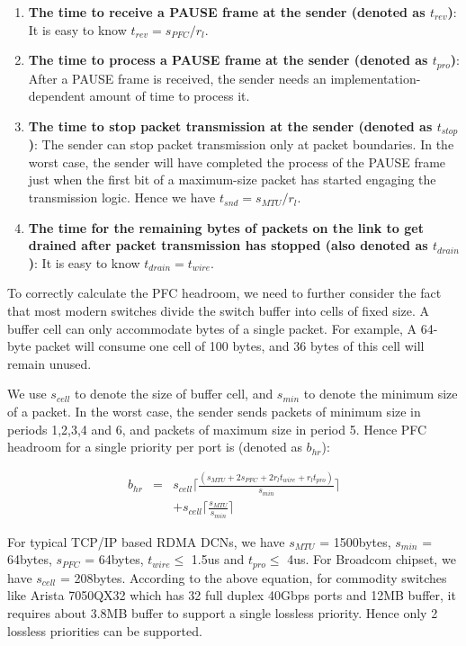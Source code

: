 {\begin{enumerate}
\item\textbf{The time to receive a PAUSE frame at the sender (denoted as $t_{rev}$)}: It is easy to know $t_{rev}=s_{PFC}/r_{l}$.

\item\textbf{The time to process a PAUSE frame at the sender (denoted as $t_{pro}$)}:  After a PAUSE frame is received, the sender needs an implementation-dependent amount of time to process it.

\item\textbf{The time to stop packet transmission at the sender (denoted as $t_{stop}$)}: The sender can stop packet transmission only at packet boundaries.  In the worst case, the sender will have completed the process of the PAUSE frame just when the first bit of a maximum-size packet has started engaging the  transmission logic. Hence we have  $t_{snd}=s_{MTU}/r_{l}$.

\item\textbf{The time for the remaining bytes of packets on the link to get drained after packet transmission has stopped (also denoted as $t_{drain}$)}: It is easy to know  $t_{drain}=t_{wire}$.

\end{enumerate}


 To correctly calculate the PFC headroom, we need to further consider the fact that most modern switches divide the switch buffer into cells of fixed size. A buffer cell can only accommodate bytes of a single packet. For example, A 64-byte packet will consume one cell of 100 bytes, and 36 bytes of this cell will remain unused.
 
 We use $s_{cell}$ to denote the size of buffer cell, and $s_{min}$ to denote the minimum size of a packet. In the worst case, the sender sends packets of minimum size in periods 1,2,3,4 and 6, and packets of maximum size in period 5. Hence
 PFC headroom for a single priority per port is (denoted as $b_{hr}$):
 
 
 \begin{eqnarray} \label{eqn:pfcheadroom}
 b_{hr}  & = &  s_{cell}\lceil\frac{(s_{MTU}+2s_{PFC}+2r_{l}t_{wire}+r_{l}t_{pro})}{s_{min}}\rceil \nonumber   \\
 & & +  s_{cell}\lceil\frac{s_{MTU}}{s_{min}}\rceil  
 \end{eqnarray}

For typical TCP/IP based RDMA DCNs, we have $s_{MTU}$ = 1500bytes, $s_{min}$ = 64bytes, $s_{PFC}$ = 64bytes, $t_{wire} \leq$ 1.5us and $t_{pro}\le $ 4us. For Broadcom chipset, we have $s_{cell}$ = 208bytes. According to the above equation, for commodity switches like Arista 7050QX32 which has 32 full duplex 40Gbps ports and 12MB buffer, it requires about 3.8MB buffer to support a single lossless priority. Hence only 2 lossless priorities can be supported.

}
